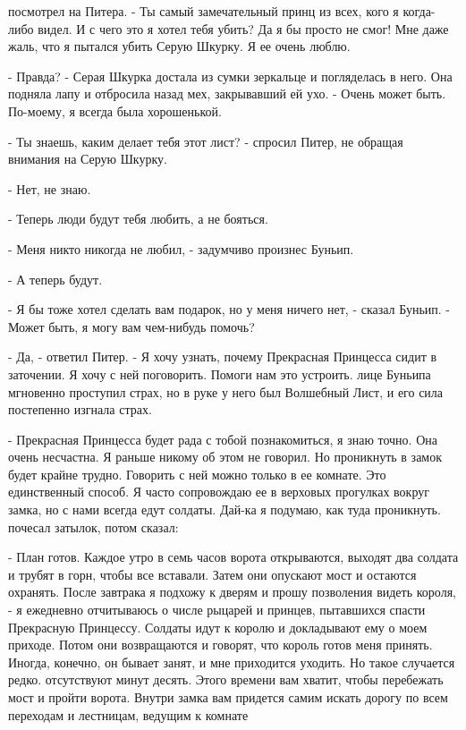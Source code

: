 посмотрел на Питера. - Ты самый замечательный принц из всех, кого я 
когда-либо видел. И с чего это я хотел тебя убить? Да я бы просто не 
смог! Мне даже жаль, что я пытался убить Серую Шкурку. Я ее очень 
люблю.
\par- Правда? - Серая Шкурка достала из сумки зеркальце и погляделась 
в него. Она подняла лапу и отбросила назад мех, закрывавший ей ухо. - 
Очень может быть. По-моему, я всегда была хорошенькой.
\par- Ты знаешь, каким делает тебя этот лист? - спросил Питер, не 
обращая внимания на Серую Шкурку.
\par- Нет, не знаю.
\par- Теперь люди будут тебя любить, а не бояться.
\par- Меня никто никогда не любил, - задумчиво произнес Буньип.
\par- А теперь будут.
\par- Я бы тоже хотел сделать вам подарок, но у меня ничего нет, - 
сказал Буньип. - Может быть, я могу вам чем-нибудь помочь?
\par- Да, - ответил Питер. - Я хочу узнать, почему Прекрасная 
Принцесса сидит в заточении. Я хочу с ней поговорить. Помоги нам это 
устроить.
 лице Буньипа мгновенно проступил страх, но в руке у него был 
Волшебный Лист, и его сила постепенно изгнала страх.
\par- Прекрасная Принцесса будет рада с тобой познакомиться, я знаю 
точно. Она очень несчастна. Я раньше никому об этом не говорил. Но 
проникнуть в замок будет крайне трудно. Говорить с ней можно только в 
ее комнате. Это единственный способ. Я часто сопровождаю ее в верховых 
прогулках вокруг замка, но с нами всегда едут солдаты. Дай-ка я 
подумаю, как туда проникнуть.
 почесал затылок, потом сказал:
\par- План готов. Каждое утро в семь часов ворота открываются, выходят 
два солдата и трубят в горн, чтобы все вставали. Затем они опускают 
мост и остаются охранять. После завтрака я подхожу к дверям и прошу 
позволения видеть короля, - я ежедневно отчитываюсь о числе рыцарей и 
принцев, пытавшихся спасти Прекрасную Принцессу. Солдаты идут к королю 
и докладывают ему о моем приходе. Потом они возвращаются и говорят, 
что король готов меня принять. Иногда, конечно, он бывает занят, и мне 
приходится уходить. Но такое случается редко.
 отсутствуют минут десять. Этого времени вам хватит, чтобы 
перебежать мост и пройти ворота. Внутри замка вам придется самим 
искать дорогу по всем переходам и лестницам, ведущим к комнате 
